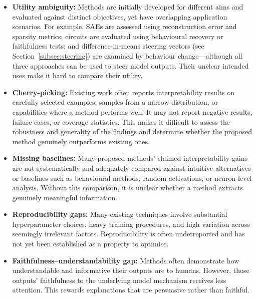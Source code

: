\begin{itemize}
\item \textbf{Utility ambiguity:} Methods are initially developed for different aims and evaluated against distinct objectives, yet have overlapping application scenarios. For example, SAEs are assessed using reconstruction error and sparsity metrics; circuits are evaluated using behavioural recovery or faithfulness tests; and difference-in-means steering vectors (see Section~\ref{subsec:steering}) are examined by behaviour change---although all three approaches can be used to steer model outputs. Their unclear intended uses make it hard to compare their utility.

\item \textbf{Cherry-picking:} Existing work often reports interpretability results on carefully selected examples, samples from a narrow distribution, or capabilities where a method performs well. It may not report negative results, failure cases, or coverage statistics. This makes it difficult to assess the robustness and generality of the findings and determine whether the proposed method genuinely outperforms existing ones.

\item \textbf{Missing baselines:} Many proposed methods' claimed interpretability gains are not systematically and adequately compared against intuitive alternatives or baselines such as behavioural methods, random activations, or neuron-level analysis. Without this comparison, it is unclear whether a method extracts genuinely meaningful information.

\item \textbf{Reproducibility gaps:} Many existing techniques involve substantial hyperparameter choices, heavy training procedures, and high variation across seemingly irrelevant factors. Reproducibility is often underreported and has not yet been established as a property to optimise.

\item \textbf{Faithfulness--understandability gap:} Methods often demonstrate how understandable and informative their outputs are to humans. However, those outputs' faithfulness to the underlying model mechanism receives less attention. This rewards explanations that are persuasive rather than faithful.

\end{itemize}

